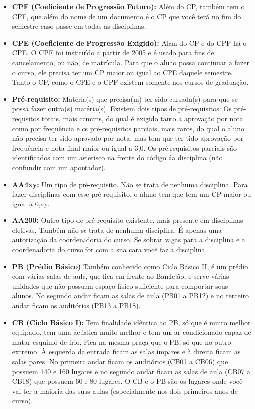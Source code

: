\begin{itemize}
    \item  \textbf{CPF (Coeficiente de Progressão Futuro):} Além do CP,
    também tem o CPF, que além do nome de um documento é o CP que você
    terá no fim do semestre caso passe em todas as disciplinas.

    \item  \textbf{CPE (Coeficiente de Progressão Exigido):} Além do CP
    e do CPF há o CPE. O CPE foi instituído a partir de 2005 e é usado
    para fins de cancelamento, ou não, de matrícula. Para que o aluno
    possa continuar a fazer o curso, ele precisa ter um CP maior ou
    igual ao CPE daquele semestre. Tanto o CP, como o CPE e o CPF
    existem somente nos cursos de graduação.

    \item  \textbf{Pré-requisito:} Matéria(s) que precisa(m) ter sido cursada(s)
    para que se possa fazer outra(s) matéria(s). Existem dois tipos de
    pré-requisitos: Os pré-requsitos totais, mais comuns, do qual é exigido
    tanto a aprovação por nota como por frequência e os pré-requisitos parciais,
    mais raros, do qual o aluno não precisa ter sido aprovado por nota, mas tem
    que ter tido aprovação por frequência e nota final maior ou igual a 3,0. Os
    pré-requisitos parciais são identificados com um asterisco na frente do
    código da disciplina (não confundir com um apontador).

    \item  \textbf{AA4xy:} Um tipo de pré-requisito. Não se trata de nenhuma
    disciplina. Para fazer disciplinas com esse pré-requisito, o aluno tem que
    tem um CP maior ou igual a 0,xy.

    \item  \textbf{AA200:} Outro tipo de pré-requisito existente, mais presente
    em disciplinas eletivas. Também não se trata de nenhuma disciplina. É apenas
    uma autorização da coordenadoria do curso. Se sobrar vagas para a disciplina
    e a coordenadoria do curso for com a sua cara você faz a disciplina.

    \item  \textbf{PB (Prédio Básico)} Também conhecido como Ciclo Básico II,
    é um prédio com várias salas de aula, que fica em frente ao Bandejão,
    e serve várias unidades que não possuem espaço físico suficiente para
    comportar seus alunos. No segundo andar ficam as salas de aula (PB01 a PB12)
    e no terceiro andar ficam os auditórios (PB13 a PB18).

    \item  \textbf{CB (Ciclo Básico I):} Tem finalidade idêntica ao PB, só que
    é muito melhor equipado, tem uma acústica muito melhor e tem um ar
    condicionado capaz de matar esquimó de frio. Fica na mesma praça que o PB,
    só que no outro extremo. À esquerda da entrada ficam as salas ímpares
    e à direita ficam as salas pares. No primeiro andar ficam os auditórios
    (CB01 a CB06) que possuem 140 e 160 lugares e no segundo andar ficam as
    salas de aula (CB07 a CB18) que possuem 60 e 80 lugares.  O CB e o PB são os
    lugares onde você vai ter a maioria das suas aulas (especialmente nos dois
    primeiros anos de curso).

\end{itemize}

